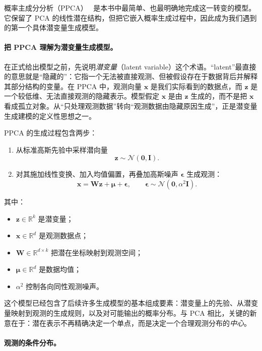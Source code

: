 概率主成分分析（PPCA）~\cite{tipping1999ppca} 是本书中最简单、也最明确地完成这一转变的模型。它保留了 PCA 的线性潜在结构，但把它嵌入概率生成过程中，因此成为我们遇到的第一个具体潜变量生成模型。

\paragraph{把 PPCA 理解为潜变量生成模型。}
在正式给出模型之前，先说明\emph{潜变量}（latent variable）这个术语。“latent”最直接的意思就是“隐藏的”：它指一个无法被直接观测、但被假设存在于数据背后并解释其部分结构的变量。在 PPCA 中，观测向量 \(\mathbf{x}\) 是我们实际看到的数据点，而 \(\mathbf{z}\) 是一个较低维、无法直接观测的隐藏表示。模型假定 \(\mathbf{x}\) 是由 \(\mathbf{z}\) 生成的，而不是把 \(\mathbf{x}\) 看成孤立对象。从“只处理观测数据”转向“观测数据由隐藏原因生成”，正是潜变量生成建模的定义性思想之一。

PPCA 的生成过程包含两步：
\begin{enumerate}
    \item 从标准高斯先验中采样潜向量
    \[
        \mathbf{z}\sim\mathcal{N}(\mathbf{0},\mathbf{I}).
    \]

    \item 对其施加线性变换、加入均值偏置，再叠加高斯噪声 \(\boldsymbol{\epsilon}\) 生成观测：
    \[
        \mathbf{x}=\mathbf{W}\mathbf{z}+\boldsymbol{\mu}+\boldsymbol{\epsilon},
        \qquad
        \boldsymbol{\epsilon}\sim\mathcal{N}(\mathbf{0},\alpha^2\mathbf{I}).
    \]
\end{enumerate}

其中：
\begin{itemize}
    \item \(\mathbf{z}\in\mathbb{R}^k\) 是潜变量；
    \item \(\mathbf{x}\in\mathbb{R}^d\) 是观测数据点；
    \item \(\mathbf{W}\in\mathbb{R}^{d\times k}\) 把潜在坐标映射到观测空间；
    \item \(\boldsymbol{\mu}\in\mathbb{R}^d\) 是数据均值；
    \item \(\alpha^2\) 控制各向同性观测噪声。
\end{itemize}

这个模型已经包含了后续许多生成模型的基本组成要素：潜变量上的先验、从潜变量映射到观测的生成规则，以及对可能输出的概率分布。与 PCA 相比，关键的新意在于：潜在表示不再精确决定一个单点，而是决定一个合理观测分布的\emph{中心}。

\paragraph{观测的条件分布。}

